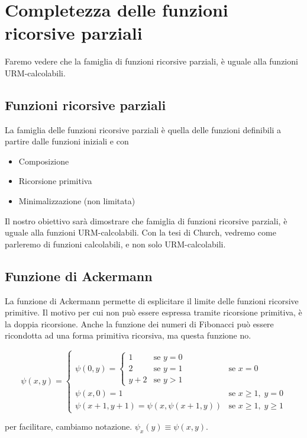 	\chapter{Completezza delle funzioni ricorsive parziali}
	
	Faremo vedere che la famiglia di funzioni ricorsive parziali, è uguale alla funzioni URM-calcolabili.
	
	\section{Funzioni ricorsive parziali}
	La famiglia delle funzioni ricorsive parziali è quella delle funzioni definibili a partire dalle funzioni iniziali e con
	\begin{itemize}
		\item Composizione
		\item Ricorsione primitiva
		\item Minimalizzazione (non limitata)
	\end{itemize}
	
	Il nostro obiettivo sarà dimostrare che famiglia di funzioni ricorsive parziali, è uguale alla funzioni URM-calcolabili. Con la tesi di Church, vedremo come parleremo di funzioni calcolabili, e non solo URM-calcolabili.
	
	\section{Funzione di Ackermann}
	La funzione di Ackermann permette di esplicitare il limite delle funzioni ricorsive primitive. Il motivo per cui non può essere espressa tramite ricorsione primitiva, è la doppia ricorsione. Anche la funzione dei numeri di Fibonacci può essere ricondotta ad una forma primitiva ricorsiva, ma questa funzione no.
	
	$$
	\psi(x,y)=
	\begin{cases}
		\psi (0, y) = \begin{cases}
			1 & \text{se } y=0 \\
			2 & \text{se } y=1 \\
			y+2 & \text{se } y>1
		\end{cases}
		& \text{se } x=0 \\[14pt]
		\psi (x, 0) = 1 & \text{se } x\geq 1,\; y=0 \\[6pt]
		\psi(x+1,y+1) = \psi(x,\psi(x + 1,y)) 
		& \text{se } x\geq 1,\; y\geq 1
	\end{cases}
	$$
	
	per facilitare, cambiamo notazione. $\psi_x(y) \equiv \psi(x,y)$.
	
